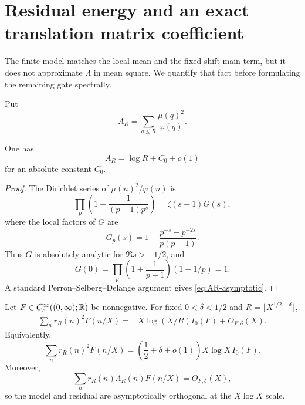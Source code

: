 \section{Residual energy and an exact translation matrix coefficient}
\label{sec:energy-cross-spectrum}

The finite model matches the local mean and the fixed-shift main term, but
it does not approximate $\Lambda$ in mean square.  We quantify that fact
before formulating the remaining gate spectrally.

Put
\begin{equation}
 A_R=\sum_{q\le R}\frac{\mu(q)^2}{\varphi(q)}.
 \label{eq:AR-definition}
\end{equation}

\begin{lemma}
\label{lem:AR-asymptotic}
One has
\begin{equation}
 A_R=\log R+C_0+o(1)
 \label{eq:AR-asymptotic}
\end{equation}
for an absolute constant $C_0$.
\end{lemma}

\begin{proof}
The Dirichlet series of $\mu(n)^2/\varphi(n)$ is
\[
 \prod_p\left(1+\frac1{(p-1)p^s}\right)
 =\zeta(s+1)G(s),
\]
where the local factors of $G$ are
\[
 G_p(s)=1+\frac{p^{-s}-p^{-2s}}{p(p-1)}.
\]
Thus $G$ is absolutely analytic for $\Re s>-1/2$, and
\[
 G(0)=\prod_p\left(1+\frac1{p-1}\right)(1-1/p)=1.
\]
A standard Perron--Selberg--Delange argument gives
\eqref{eq:AR-asymptotic}.
\end{proof}

\begin{theorem}
\label{thm:residual-energy-law}
Let $F\in C_c^\infty((0,\infty);\mathbb R)$ be nonnegative.  For fixed
$0<\delta<1/2$ and $R=\lfloor X^{1/2-\delta}\rfloor$,
\begin{align}
 \sum_n r_R(n)^2F(n/X)
 ={}&X\log(X/R)I_0(F)+O_{F,\delta}(X).
 \label{eq:residual-energy-law}
\end{align}
Equivalently,
\begin{equation}
 \sum_n r_R(n)^2F(n/X)
 =\left(\frac12+\delta+o(1)\right)
 X\log X\,I_0(F).
 \label{eq:residual-energy-delta-form}
\end{equation}
Moreover,
\begin{equation}
 \sum_n r_R(n)\Lambda_R(n)F(n/X)=O_{F,\delta}(X),
 \label{eq:asymptotic-energy-orthogonality}
\end{equation}
so the model and residual are asymptotically orthogonal at the
$X\log X$ scale.
\end{theorem}

